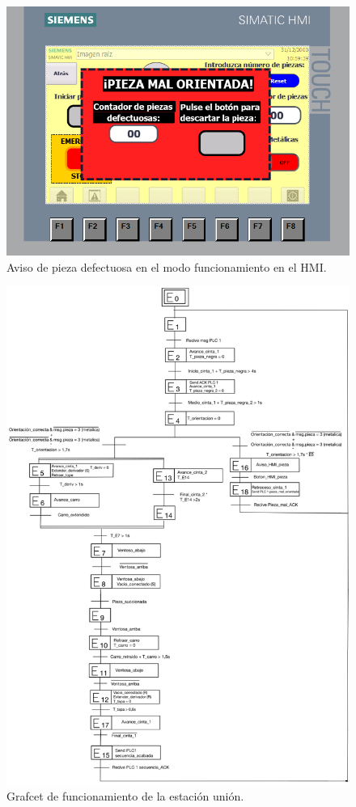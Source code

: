\begin{figure}[h!]
  \includegraphics[width=16cm]{figs/HMI_descarte}
  \caption{\centering Aviso de pieza defectuosa en el modo funcionamiento en el HMI.}
  \label{fig:HMI_descarte}
\end{figure}

\begin{figure}[h!]
  \includegraphics[width=15cm]{figs/grafcet_union}
  \caption{\centering Grafcet de funcionamiento de la estación unión.}
  \label{fig:grafcet_union}
\end{figure}

